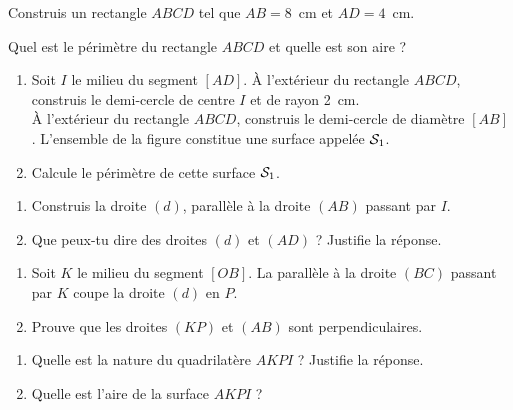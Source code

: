 \begin{myenumerate}
\item Construis un rectangle $ABCD$ tel que $AB=8$~cm et $AD=4$~cm.
\item Quel est le périmètre du rectangle $ABCD$ et quelle est son aire ?
\item
\begin{enumerate}
\item Soit $I$ le milieu du segment $[AD]$. \`A l'extérieur du rectangle
$ABCD$, construis le demi-cercle de centre $I$ et de rayon 2~cm.\\\`A
l'extérieur du rectangle $ABCD$, construis le demi-cercle de diamètre
$[AB]$. L'ensemble de la figure constitue une surface appelée ${\cal
S}_1$.
\item Calcule le périmètre de cette surface ${\cal S}_1$.
\end{enumerate}
\item
\begin{enumerate}
\item Construis la droite $(d)$, parallèle à la droite $(AB)$ passant
par $I$.
\item Que peux-tu dire des droites $(d)$ et $(AD)$ ? Justifie la
réponse.
\end{enumerate}
\item
\begin{enumerate}
\item Soit $K$ le milieu du segment $[OB]$. La parallèle à la droite
$(BC)$ passant par $K$ coupe la droite $(d)$ en $P$.
\item Prouve que les droites $(KP)$ et $(AB)$ sont perpendiculaires.
\end{enumerate}
\item
\begin{enumerate}
\item Quelle est la nature du quadrilatère $AKPI$ ? Justifie la
réponse.
\item Quelle est l'aire de la surface $AKPI$ ?
\end{enumerate}
\end{myenumerate}